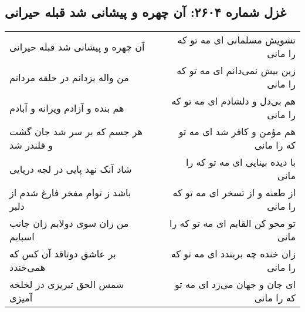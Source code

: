 \begin{center}
\section*{غزل شماره ۲۶۰۴: آن چهره و پیشانی شد قبله حیرانی}
\label{sec:2604}
\begin{longtable}{l p{0.5cm} r}
آن چهره و پیشانی شد قبله حیرانی
&&
تشویش مسلمانی ای مه تو که را مانی
\\
من واله یزدانم در حلقه مردانم
&&
زین بیش نمی‌دانم ای مه تو که را مانی
\\
هم بنده و آزادم ویرانه و آبادم
&&
هم بی‌دل و دلشادم ای مه تو که را مانی
\\
هر جسم که بر سر شد جان گشت و قلندر شد
&&
هم مؤمن و کافر شد ای مه تو که را مانی
\\
شاد آنک نهد پایی در لجه دریایی
&&
با دیده بینایی ای مه تو که را مانی
\\
باشد ز توام مفخر فارغ شدم از دلبر
&&
از طعنه و از تسخر ای مه تو که را مانی
\\
من زان سوی دولابم زان جانب اسبابم
&&
تو محو کن القابم ای مه تو که را مانی
\\
بر عاشق دوتاقد آن کس که همی‌خندد
&&
زان خنده چه بربندد ای مه تو که را مانی
\\
شمس الحق تبریزی در لخلخه آمیزی
&&
ای جان و جهان می‌زد ای مه تو که را مانی
\\
\end{longtable}
\end{center}

